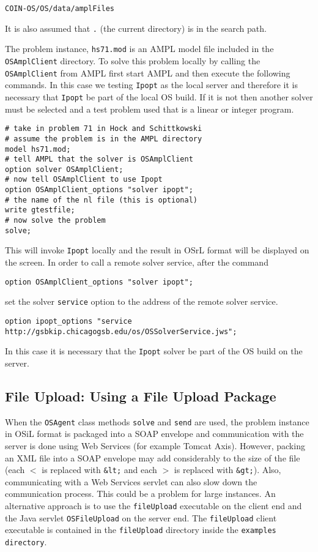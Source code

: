 \documentclass[11pt]{article}
\renewcommand{\_}{{\char"5F}}
\renewcommand{\{}{{\char"7B}}
\renewcommand{\}}{{\char"7D}}
\renewcommand{\^}{{\char"0D}}
\renewcommand{\'}{{\char"0D}}
\begin{document}
\begin{verbatim}
COIN-OS/OS/data/amplFiles
\end{verbatim}
It is also assumed that {\tt .} (the current directory) is in the search path.

The  problem instance, {\tt hs71.mod} is an AMPL model file included in the {\tt OSAmplClient} directory. To solve this problem locally by calling the {\tt OSAmplClient} from AMPL first start AMPL and then execute the following commands. In this case we testing  {\tt Ipopt} as the local server and therefore it is necessary that {\tt Ipopt} be part of the local OS build. If it is not then another solver must be selected and a test problem used that is a linear or integer program.

\begin{verbatim}
# take in problem 71 in Hock and Schittkowski
# assume the problem is in the AMPL directory
model hs71.mod;
# tell AMPL that the solver is OSAmplClient
option solver OSAmplClient;
# now tell OSAmplClient to use Ipopt
option OSAmplClient_options "solver ipopt";
# the name of the nl file (this is optional)
write gtestfile;
# now solve the problem
solve;
\end{verbatim}

This will invoke {\tt Ipopt} locally and the result in OSrL format will be displayed on the screen. In order to call a remote solver service, after the command
\begin{verbatim}
option OSAmplClient_options "solver ipopt";
\end{verbatim}
set the solver {\tt service} option to  the address of the remote solver service.
\begin{verbatim}
option ipopt_options "service http://gsbkip.chicagogsb.edu/os/OSSolverService.jws";
\end{verbatim}
In this case it is necessary that the {\tt Ipopt} solver be part of the OS build on the server.






\subsection{File Upload:  Using a File Upload Package}\label{section:fileupload}



When the {\tt OSAgent}  class methods {\tt solve} and {\tt send} are used, the problem instance in OSiL format is packaged into a SOAP envelope and communication with the server is done using Web Services (for example Tomcat Axis). However, packing an XML file into a SOAP envelope may add considerably to the size of the file (each {\tt $<$} is replaced with {\tt \&lt;}  and each {\tt $>$} is replaced with {\tt \&gt;}). Also, communicating with a Web Services servlet can also slow down the communication process. This could be a problem for large instances. An alternative approach is to use the {\tt fileUpload} executable on the client end  and the Java servlet {\tt OSFileUpload} on the server end.  The {\tt fileUpload} client executable is contained in the {\tt fileUpload}  directory inside the {\tt examples directory}.
\end{document}

